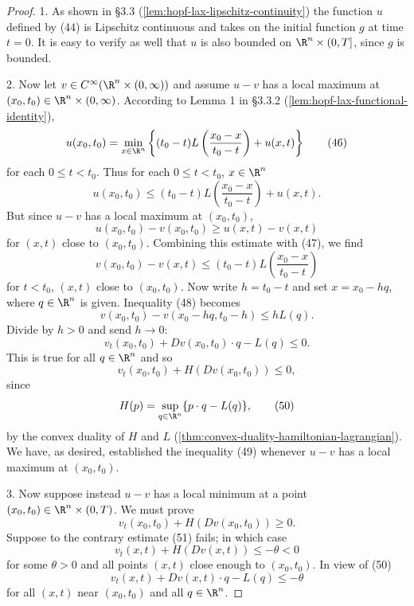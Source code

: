 \begin{proof}
1. As shown in \S3.3 (\cref{lem:hopf-lax-lipschitz-continuity}) the function $u$ defined by (44) is Lipschitz continuous and takes on the initial function $g$ at time $t = 0$. It is easy to verify as well that $u$ is also bounded on $\R^n \times (0,T]$, since $g$ is bounded.

2. Now let $v \in C^\infty(\R^n \times (0, \infty))$ and assume $u - v$ has a local maximum at $(x_0, t_0) \in \R^n \times (0, \infty)$. According to Lemma 1 in \S3.3.2 (\cref{lem:hopf-lax-functional-identity}),
\[
u(x_0, t_0) = \min_{x \in \R^n} \left\{ (t_0 - t)L \left( \frac{x_0 - x}{t_0 - t} \right) + u(x,t) \right\}
\tag{46}
\]
for each $0 \le t < t_0$. Thus for each $0 \le t < t_0$, $x \in \R^n$
\[
u(x_0, t_0) \le (t_0 - t)L \left( \frac{x_0 - x}{t_0 - t} \right) + u(x,t).
\tag{47}
\]
But since $u - v$ has a local maximum at $(x_0, t_0)$,
\[
u(x_0, t_0) - v(x_0, t_0) \ge u(x,t) - v(x,t)
\]
for $(x,t)$ close to $(x_0, t_0)$. Combining this estimate with (47), we find
\[
v(x_0, t_0) - v(x, t) \leq (t_0 - t)L\left(\frac{x_0 - x}{t_0 - t}\right)
\tag{48}
\]
for $t < t_0$, $(x,t)$ close to $(x_0, t_0)$. Now write $h = t_0 - t$ and set $x = x_0 - hq$, where $q \in \R^n$ is given. Inequality (48) becomes
\[
v(x_0, t_0) - v(x_0 - hq, t_0 - h) \leq hL(q).
\]
Divide by $h > 0$ and send $h \to 0$:
\[
v_t(x_0, t_0) + Dv(x_0, t_0) \cdot q - L(q) \leq 0.
\]
This is true for all $q \in \R^n$ and so
\[
v_t(x_0, t_0) + H(Dv(x_0, t_0)) \leq 0,
\tag{49}
\]
since
\[
H(p) = \sup_{q \in \R^n} \{p \cdot q - L(q)\},
\tag{50}
\]
by the convex duality of $H$ and $L$ (\cref{thm:convex-duality-hamiltonian-lagrangian}). We have, as desired, established the inequality (49) whenever $u - v$ has a local maximum at $(x_0, t_0)$.

3. Now suppose instead $u - v$ has a local minimum at a point $(x_0, t_0) \in \R^n \times (0, T)$. We must prove
\[
v_t(x_0, t_0) + H(Dv(x_0, t_0)) \geq 0.
\tag{51}
\]
Suppose to the contrary estimate (51) fails; in which case
\[
v_t(x, t) + H(Dv(x, t)) \leq -\theta < 0
\]
for some $\theta > 0$ and all points $(x,t)$ close enough to $(x_0, t_0)$. In view of (50)
\[
v_t(x, t) + Dv(x, t) \cdot q - L(q) \leq -\theta
\tag{52}
\]
for all $(x, t)$ near $(x_0, t_0)$ and all $q \in \R^n$.


\end{proof}
